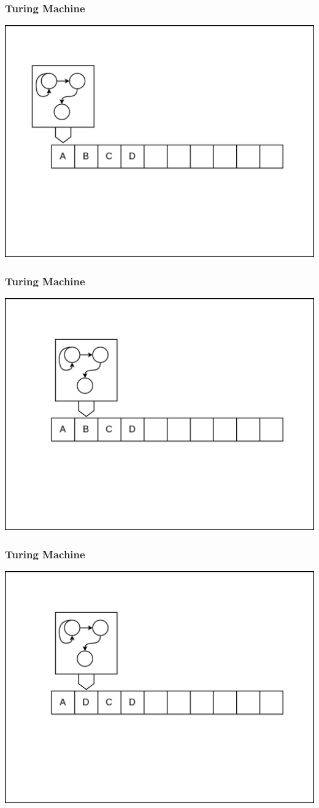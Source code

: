 \documentclass[aspectratio=169, handout]{beamer}
\begin{document}
\begin{frame}
  \frametitle{Turing Machine}
  \begin{center}
    \includegraphics[width=.75\textwidth]{frame1.png}
  \end{center}
\end{frame}

\begin{frame}
  \frametitle{Turing Machine}
  \begin{center}
    \includegraphics[width=.75\textwidth]{frame2.png}
  \end{center}
\end{frame}

\begin{frame}
  \frametitle{Turing Machine}
  \begin{center}
    \includegraphics[width=.75\textwidth]{frame3.png}
  \end{center}
\end{frame}
\end{document}
